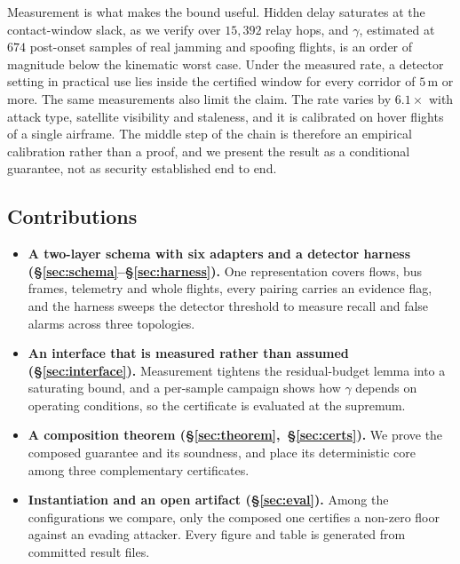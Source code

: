 Measurement is what makes the bound useful. Hidden delay saturates at the
contact-window slack, as we verify over $15{,}392$ relay hops, and $\gamma$,
estimated at $674$ post-onset samples of real jamming and spoofing flights, is
an order of magnitude below the kinematic worst case. Under the measured rate, a
detector setting in practical use lies inside the certified window for every
corridor of $5$\,m or more. The same measurements also limit the claim. The rate
varies by $6.1\times$ with attack type, satellite visibility and staleness, and
it is calibrated on hover flights of a single airframe. The middle step of the
chain is therefore an empirical calibration rather than a proof, and we present
the result as a conditional guarantee, not as security established end to end.

\subsection*{Contributions}
\begin{itemize}
\item \textbf{A two-layer schema with six adapters and a detector harness
(\S\ref{sec:schema}--\S\ref{sec:harness}).} One representation covers flows,
bus frames, telemetry and whole flights, every pairing carries an evidence
flag, and the harness sweeps the detector threshold to measure recall and false
alarms across three topologies.
\item \textbf{An interface that is measured rather than assumed
(\S\ref{sec:interface}).} Measurement tightens the residual-budget lemma into a
saturating bound, and a per-sample campaign shows how $\gamma$ depends on
operating conditions, so the certificate is evaluated at the supremum.
\item \textbf{A composition theorem (\S\ref{sec:theorem},~\S\ref{sec:certs}).}
We prove the composed guarantee and its soundness, and place its deterministic
core among three complementary certificates.
\item \textbf{Instantiation and an open artifact (\S\ref{sec:eval}).} Among the
configurations we compare, only the composed one certifies a non-zero floor
against an evading attacker. Every figure and table is generated from committed
result files.
\end{itemize}

